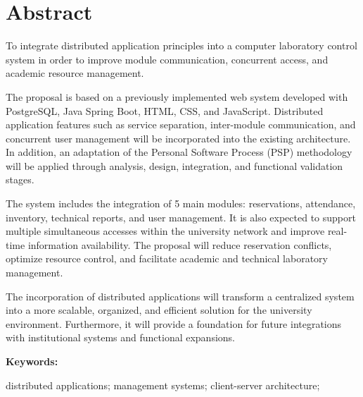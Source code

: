 \documentclass[12pt,a4paper]{article}
\begin{document}
\section{Abstract}

\begin{tcolorbox}

To integrate distributed application principles into a computer laboratory control system in order to improve module communication, concurrent access, and academic resource management.

\vspace{0.2cm}

The proposal is based on a previously implemented web system developed with PostgreSQL, Java Spring Boot, HTML, CSS, and JavaScript. Distributed application features such as service separation, inter-module communication, and concurrent user management will be incorporated into the existing architecture. In addition, an adaptation of the Personal Software Process (PSP) methodology will be applied through analysis, design, integration, and functional validation stages.

\vspace{0.2cm}

The system includes the integration of 5 main modules: reservations, attendance, inventory, technical reports, and user management. It is also expected to support multiple simultaneous accesses within the university network and improve real-time information availability. The proposal will reduce reservation conflicts, optimize resource control, and facilitate academic and technical laboratory management.

\vspace{0.2cm}

The incorporation of distributed applications will transform a centralized system into a more scalable, organized, and efficient solution for the university environment. Furthermore, it will provide a foundation for future integrations with institutional systems and functional expansions.




\end{tcolorbox}

\vspace{6cm}

\textbf{Keywords:}

\vspace{0.2cm}

distributed applications; management systems; client-server architecture; 
\end{document}
